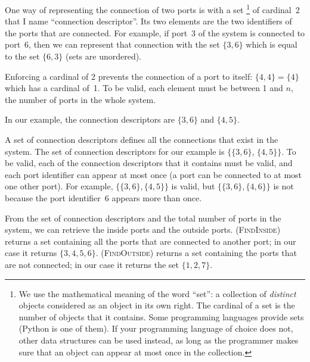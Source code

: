 \begin{refsection}
One way of representing the connection of two ports is with a set%
\footnote{
    We use the mathematical meaning of the word ``set'': a collection of \textit{distinct} objects considered as an object in its own right.
    The cardinal of a set is the number of objects that it contains.
    Some programming languages provide sets (Python is one of them).
    If your programming language of choice does not, other data structures can be used instead, as long as the programmer makes sure that an object can appear at most once in the collection.
}
of cardinal~2 that I name ``connection descriptor''.
Its two elements are the two identifiers of the ports that are connected.
For example, if port~3 of the system is connected to port~6, then we can represent that connection with the set $\lbrace 3, 6\rbrace$ which is equal to the set $\lbrace 6, 3\rbrace$ (sets are unordered).

Enforcing a cardinal of 2 prevents the connection of a port to itself: $\lbrace 4, 4\rbrace = \lbrace 4\rbrace$ which has a cardinal of~1.
To be valid, each element must be between 1 and $n$, the number of ports in the whole system.

In our example, the connection descriptors are $\lbrace 3, 6 \rbrace$ and $\lbrace 4, 5 \rbrace$.

A set of connection descriptors defines all the connections that exist in the system.
The set of connection descriptors for our example is
$\lbrace \lbrace 3, 6 \rbrace$, $\lbrace 4, 5 \rbrace \rbrace$.
To be valid, each of the connection descriptors that it contains must be valid, and each port identifier can appear at most once (a port can be connected to at most one other port).
For example,
$\lbrace \lbrace 3, 6 \rbrace, \lbrace 4, 5 \rbrace \rbrace$
is valid, but 
$\lbrace \lbrace 3, 6 \rbrace, \lbrace 4, 6 \rbrace \rbrace$
is not because the port identifier~6 appears more than once.

From the set of connection descriptors and the total number of ports in the system, we can retrieve the inside ports and the outside ports.
 (\textsc{FindInside}) returns a set containing all the ports that are connected to another port; in our case it returns $\lbrace 3, 4, 5, 6 \rbrace$.
 (\textsc{FindOutside}) returns a set containing the ports that are not connected; in our case it returns the set $\lbrace 1, 2, 7 \rbrace$.


\end{refsection}

